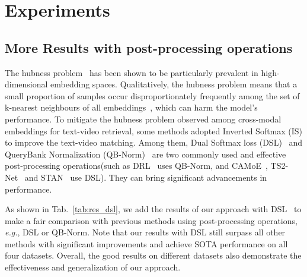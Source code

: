 \documentclass[sigconf]{acmart}
\begin{document}
\section{Experiments}
\subsection{More Results with post-processing operations}

The hubness problem~\cite{radovanovic2010hubs,liu2019strong} has been shown to be particularly prevalent in high-dimensional embedding spaces. Qualitatively, the hubness problem means that a small proportion of samples occur disproportionately frequently among the set of k-nearest neighbours of all embeddings~\cite{querybank2022}, which can harm the model's performance. To mitigate the hubness problem observed among cross-modal embeddings for text-video retrieval, some methods adopted Inverted Softmax (IS) to improve the text-video matching. Among them, Dual Softmax loss (DSL)~\cite{camoe2021} and QueryBank Normalization (QB-Norm)~\cite{querybank2022} are two commonly used and effective post-processing operations(such as DRL~\cite{drl2022} uses QB-Norm, and CAMoE~\cite{camoe2021}, TS2-Net~\cite{ts2net2022} and STAN~\cite{liu2023revisiting} use DSL). They can bring significant advancements in performance. 

As shown in Tab.~\ref{tab:res_dsl}, we add the results of our approach with DSL~\cite{camoe2021} to make a fair comparison with previous methods using post-processing operations, \emph{e.g.}, DSL or QB-Norm. Note that our results with DSL still surpass all other methods with significant improvements and achieve SOTA performance on all four datasets. Overall, the good results on different datasets also demonstrate the effectiveness and generalization of our approach.
\end{document}
